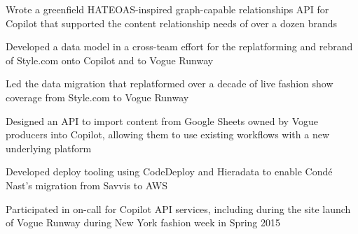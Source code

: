 \begin{job}

  \begin{accomplishments}
    \item Wrote a greenfield HATEOAS-inspired graph-capable relationships API
    for Copilot that supported the content relationship needs of over a dozen
    brands
    \item Developed a data model in a cross-team effort for the replatforming
    and rebrand of Style.com onto Copilot and to Vogue Runway
    \item Led the data migration that replatformed over a decade of live fashion
    show coverage from Style.com to Vogue Runway
    \item Designed an API to import content from Google Sheets owned by Vogue
    producers into Copilot, allowing them to use existing workflows with a new
    underlying platform
    \item Developed deploy tooling using CodeDeploy and Hieradata to enable
    Cond\'{e} Nast's migration from Savvis to AWS
    \item Participated in on-call for Copilot API services, including during the
    site launch of Vogue Runway during New York fashion week in Spring 2015
  \end{accomplishments}
\end{job}
